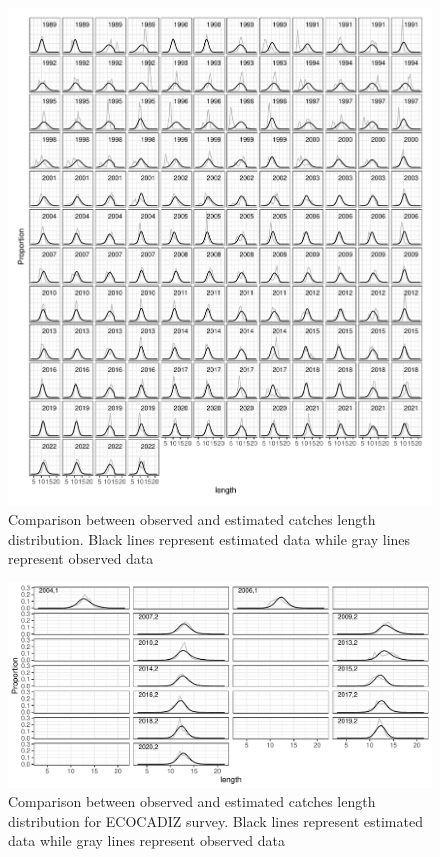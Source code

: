 \documentclass[review]{elsarticle}
\begin{document}


\begin{figure}[h!]
 \centering
 \includegraphics[bb=0 0 595 697]{./lendist.pdf}
 \caption{ Comparison between observed and estimated catches length distribution. Black lines represent estimated data while gray lines represent observed data}
 \label{lendist}
\end{figure}

\begin{figure}[h!]
 \centering
 \includegraphics[bb=0 0 595 697]{./ecodist.pdf}
 \caption{ Comparison between observed and estimated catches length distribution for ECOCADIZ survey. Black lines represent estimated data while gray lines represent observed data}
 \label{ecodist}
\end{figure}
\end{document}

